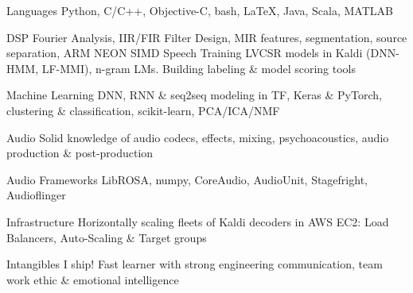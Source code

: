 

\begin{cvskills}

  \cvskill
    {Languages} %
    {Python, C/C++, Objective-C, bash, LaTeX, Java, Scala, MATLAB}
    
  \cvskill
    {DSP} %
    {Fourier Analysis, IIR/FIR Filter Design, MIR features, segmentation, source separation, ARM NEON SIMD} %
  \cvskill
    {Speech} %
    {Training LVCSR models in Kaldi (DNN-HMM, LF-MMI), n-gram LMs. Building labeling \& model scoring tools} %

  \cvskill
    {Machine Learning} %
    {DNN, RNN \& seq2seq modeling in TF, Keras \& PyTorch, clustering \& classification, scikit-learn, PCA/ICA/NMF} %
    
  \cvskill
    {Audio} %
    {Solid knowledge of audio codecs, effects, mixing, psychoacoustics, audio production \& post-production } %

  \cvskill
    {Audio Frameworks} %
    {LibROSA, numpy, CoreAudio, AudioUnit, Stagefright, Audioflinger} %

  \cvskill
    {Infrastructure} %
    {Horizontally scaling fleets of Kaldi decoders in AWS EC2: Load Balancers, Auto-Scaling \& Target groups} %

  \cvskill
    {Intangibles} %
    {I ship! Fast learner with strong engineering communication, team work ethic \& emotional intelligence} %



\end{cvskills}

